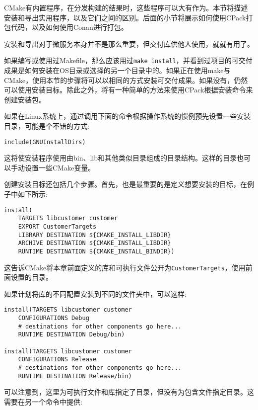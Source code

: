 
CMake有内置程序，在分发构建的结果时，这些程序可以大有作为。本节将描述安装和导出实用程序，以及它们之间的区别。后面的小节将展示如何使用CPack打包代码，以及如何使用Conan进行打包。

安装和导出对于微服务本身并不是那么重要，但交付库供他人使用，就就有用了。


如果编写或使用过Makefile，那么应该用过\texttt{make install}，并看到过项目的可交付成果是如何安装在OS目录或选择的另一个目录中的。如果正在使用make与CMake，使用本节的步骤将可以以相同的方式安装可交付成果。如果没有，仍然可以使用安装目标。除此之外，将有一种简单的方法来使用CPack根据安装命令来创建安装包。

如果在Linux系统上，通过调用下面的命令根据操作系统的惯例预先设置一些安装目录，可能是个不错的方式:

\begin{lstlisting}[style=styleCMake]
include(GNUInstallDirs)
\end{lstlisting}

这将使安装程序使用由bin、lib和其他类似目录组成的目录结构。这样的目录也可以手动设置一些CMake变量。

创建安装目标还包括几个步骤。首先，也是最重要的是定义想要安装的目标，在例子中如下所示:

\begin{lstlisting}[style=styleCMake]
install(
	TARGETS libcustomer customer
	EXPORT CustomerTargets
	LIBRARY DESTINATION ${CMAKE_INSTALL_LIBDIR}
	ARCHIVE DESTINATION ${CMAKE_INSTALL_LIBDIR}
	RUNTIME DESTINATION ${CMAKE_INSTALL_BINDIR})
\end{lstlisting}

这告诉CMake将本章前面定义的库和可执行文件公开为\texttt{CustomerTargets}，使用前面设置的目录。

如果计划将库的不同配置安装到不同的文件夹中，可以这样:

\begin{lstlisting}[style=styleCMake]
install(TARGETS libcustomer customer
	CONFIGURATIONS Debug
	# destinations for other components go here...
	RUNTIME DESTINATION Debug/bin)
	
install(TARGETS libcustomer customer
	CONFIGURATIONS Release
	# destinations for other components go here...
	RUNTIME DESTINATION Release/bin)
\end{lstlisting}

可以注意到，这里为可执行文件和库指定了目录，但没有为包含文件指定目录。这需要在另一个命令中提供:

